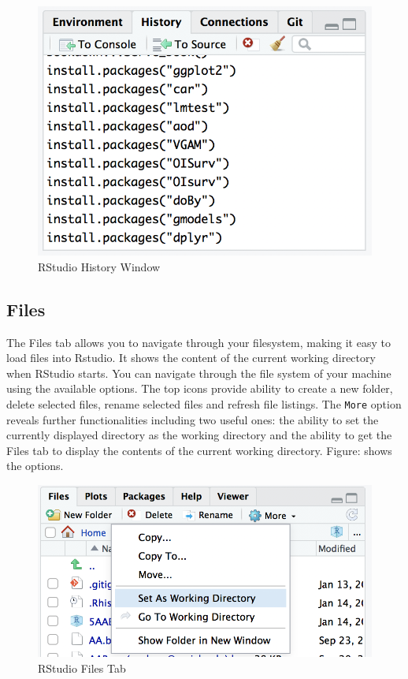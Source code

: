 \documentclass[]{krantz}
\theoremstyle{definition}
\theoremstyle{definition}
\theoremstyle{definition}
\theoremstyle{remark}
\begin{document}
\begin{figure}

{\centering \includegraphics[width=0.5\linewidth]{images/history} 

}

\caption{RStudio History Window}\label{fig:unnamed-chunk-5}
\end{figure}

\subsection{Files}\label{files}

The Files tab allows you to navigate through your filesystem, making it
easy to load files into Rstudio. It shows the content of the current
working directory when RStudio starts. You can navigate through the file
system of your machine using the available options. The top icons
provide ability to create a new folder, delete selected files, rename
selected files and refresh file listings. The \texttt{More} option
reveals further functionalities including two useful ones: the ability
to set the currently displayed directory as the working directory and
the ability to get the Files tab to display the contents of the current
working directory. Figure: shows the options.

\begin{figure}

{\centering \includegraphics[width=0.5\linewidth]{images/files} 

}

\caption{RStudio Files Tab}\label{fig:unnamed-chunk-6}
\end{figure}
\end{document}
